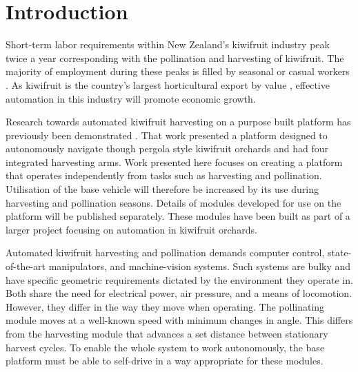 \documentclass[preprint,authoryear,12pt]{elsarticle}
\begin{document}

\section{Introduction}
\label{sect:intro}
    Short-term labor requirements within New Zealand's kiwifruit industry peak twice a year corresponding with the pollination and harvesting of kiwifruit.
    The majority of employment during these peaks is filled by seasonal or casual workers \citep{Timmins2009}.
    As kiwifruit is the country's largest horticultural export by value \citep{StatisticsNewZealand2015}, effective automation in this industry will promote economic growth.

    Research towards automated kiwifruit harvesting on a purpose built platform has previously been demonstrated \citep{Scarfe2012}.
    That work presented a platform designed to autonomously navigate though pergola style kiwifruit orchards and had four integrated harvesting arms.
    Work presented here focuses on creating a platform that operates independently from tasks such as harvesting and pollination.
    Utilisation of the base vehicle will therefore be increased by its use during harvesting and pollination seasons.
    Details of modules developed for use on the platform will be published separately.
    These modules have been built as part of a larger project focusing on automation in kiwifruit orchards.

    Automated kiwifruit harvesting and pollination demands computer control, state-of-the-art manipulators, and machine-vision systems.
    Such systems are bulky and have specific geometric requirements dictated by the environment they operate in.
    Both share the need for electrical power, air pressure, and a means of locomotion.
    However, they differ in the way they move when operating.
    The pollinating module moves at a well-known speed with minimum changes in angle.
    This differs from the harvesting module that advances a set distance between stationary harvest cycles.
    To enable the whole system to work autonomously, the base platform must be able to self-drive in a way appropriate for these modules.
\end{document}
